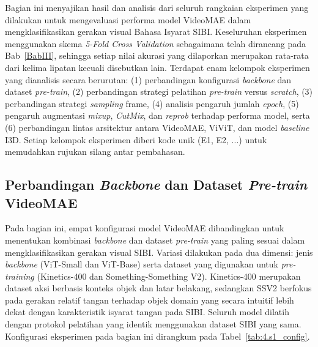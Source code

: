 Bagian ini menyajikan hasil dan analisis dari seluruh rangkaian eksperimen yang dilakukan untuk mengevaluasi performa model VideoMAE dalam mengklasifikasikan gerakan visual Bahasa Isyarat SIBI. Keseluruhan eksperimen menggunakan skema \textit{5-Fold Cross Validation} sebagaimana telah dirancang pada Bab~\ref{BabIII}, sehingga setiap nilai akurasi yang dilaporkan merupakan rata-rata dari kelima lipatan kecuali disebutkan lain. Terdapat enam kelompok eksperimen yang dianalisis secara berurutan: (1) perbandingan konfigurasi \textit{backbone} dan dataset \textit{pre-train}, (2) perbandingan strategi pelatihan \textit{pre-train} versus \textit{scratch}, (3) perbandingan strategi \textit{sampling} frame, (4) analisis pengaruh jumlah \textit{epoch}, (5) pengaruh augmentasi \textit{mixup}, \textit{CutMix}, dan \textit{reprob} terhadap performa model, serta (6) perbandingan lintas arsitektur antara VideoMAE, ViViT, dan model \textit{baseline} I3D. Setiap kelompok eksperimen diberi kode unik (E1, E2, ...) untuk memudahkan rujukan silang antar pembahasan.\par

\subsection{Perbandingan \textit{Backbone} dan Dataset \textit{Pre-train} VideoMAE} \label{IV.Sek1}

Pada bagian ini, empat konfigurasi model VideoMAE dibandingkan untuk menentukan kombinasi \textit{backbone} dan dataset \textit{pre-train} yang paling sesuai dalam mengklasifikasikan gerakan visual SIBI. Variasi dilakukan pada dua dimensi: jenis \textit{backbone} (ViT-Small dan ViT-Base) serta dataset yang digunakan untuk \textit{pre-training} (Kinetics-400 dan Something-Something V2). Kinetics-400 merupakan dataset aksi berbasis konteks objek dan latar belakang, sedangkan SSV2 berfokus pada gerakan relatif tangan terhadap objek domain yang secara intuitif lebih dekat dengan karakteristik isyarat tangan pada SIBI. Seluruh model dilatih dengan protokol pelatihan yang identik menggunakan dataset SIBI yang sama. Konfigurasi eksperimen pada bagian ini dirangkum pada Tabel~\ref{tab:4.s1_config}.\par

